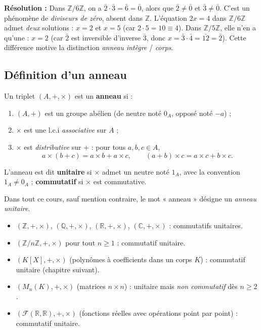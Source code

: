 \textbf{Résolution :} Dans $\mathbb{Z}/6\mathbb{Z}$, on a $\bar{2} \cdot \bar{3} = \bar{6} = \bar{0}$, alors que $\bar{2} \neq \bar{0}$ et $\bar{3} \neq \bar{0}$. C'est un phénomène de \emph{diviseurs de zéro}, absent dans $\mathbb{Z}$.
L'équation $2x = 4$ dans $\mathbb{Z}/6\mathbb{Z}$ admet \emph{deux} solutions : $x = 2$ et $x = 5$ (car $2 \cdot 5 = 10 \equiv 4$). Dans $\mathbb{Z}/5\mathbb{Z}$, elle n'en a qu'une : $x = 2$ (car $\bar{2}$ est inversible d'inverse $\bar{3}$, donc $x = \bar{3} \cdot \bar{4} = \bar{12} = \bar{2}$). Cette différence motive la distinction \emph{anneau intègre} / \emph{corps}.

\subsection{Définition d'un anneau}

\begin{definition}[Anneau]
Un triplet $(A, +, \times)$ est un \textbf{anneau} si :
\begin{enumerate}
    \item $(A, +)$ est un groupe abélien (de neutre noté $0_A$, opposé noté $-a$) ;
    \item $\times$ est une l.c.i \emph{associative} sur $A$ ;
    \item $\times$ est \emph{distributive} sur $+$ : pour tous $a, b, c \in A$,
    \[ a \times (b + c) = a \times b + a \times c, \qquad (a + b) \times c = a \times c + b \times c. \]
\end{enumerate}
L'anneau est dit \textbf{unitaire} si $\times$ admet un neutre noté $1_A$, avec la convention $1_A \neq 0_A$ ; \textbf{commutatif} si $\times$ est commutative.
\end{definition}

\begin{remarque}
Dans tout ce cours, sauf mention contraire, le mot « anneau » désigne un \emph{anneau unitaire}.
\end{remarque}

\begin{exemple}
\begin{itemize}
    \item $(\mathbb{Z}, +, \times)$, $(\mathbb{Q}, +, \times)$, $(\mathbb{R}, +, \times)$, $(\mathbb{C}, +, \times)$ : commutatifs unitaires.
    \item $(\mathbb{Z}/n\mathbb{Z}, +, \times)$ pour tout $n \ge 1$ : commutatif unitaire.
    \item $(K[X], +, \times)$ (polynômes à coefficients dans un corps $K$) : commutatif unitaire (chapitre suivant).
    \item $(M_n(K), +, \times)$ (matrices $n \times n$) : unitaire mais \emph{non commutatif} dès $n \ge 2$.
    \item $(\mathcal{F}(\mathbb{R}, \mathbb{R}), +, \times)$ (fonctions réelles avec opérations point par point) : commutatif unitaire.
\end{itemize}
\end{exemple}

